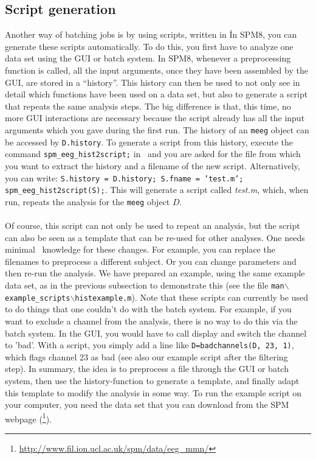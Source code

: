 \subsection{Script generation}
Another way of batching jobs is by using scripts, written in \matlab\. In SPM8, you can generate these scripts automatically. To do this, you first have to analyze one data set using the GUI or batch system. In SPM8, whenever a preprocessing function is called, all the input arguments, once they have been assembled by the GUI, are stored in a ``history''. This history can then be used to not only see in detail which functions have been used on a data set, but also to generate a script that repeats the same analysis steps. The big difference is that, this time, no more GUI interactions are necessary because the script already has all the input arguments which you gave during the first run. The history of an \texttt{meeg} object can be accessed by \texttt{D.history}. To generate a script from this history, execute the command \texttt{spm\_eeg\_hist2script;} in \matlab\, and you are asked for the file from which you want to extract the history and a filename of the new script. Alternatively, you can write: \texttt{S.history = D.history; S.fname = 'test.m'; spm\_eeg\_hist2script(S);}. This will generate a script called \textit{test.m}, which, when run, repeats the analysis for the \texttt{meeg} object $D$.
\\
\\
Of course, this script can not only be used to repeat an analysis, but the script can also be seen as a template that can be re-used for other analyses. One needs minimal \matlab\ knowledge for these changes. For example, you can replace the filenames to preprocess a different subject. Or you can change parameters and then re-run the analysis. We have prepared an example, using the same example data set, as in the previous subsection to demonstrate this (see the file \texttt{man$\backslash$example\_scripts$\backslash$histexample.m}). Note that these scripts can currently be used to do things that one couldn't do with the batch system. For example, if you want to exclude a channel from the analysis, there is no way to do this via the batch system. In the GUI, you would have to call display and switch the channel to 'bad'. With a script, you simply add a line like \texttt{D=badchannels(D, 23, 1)}, which flags channel 23 as bad (see also our example script after the filtering step). In summary, the idea is to preprocess a file through the GUI or batch system, then use the history-function to generate a template, and finally adapt this template to modify the analysis in some way. To run the example script on your computer, you need the data set that you can download from the SPM webpage (\footnote{\url{http://www.fil.ion.ucl.ac.uk/spm/data/eeg\_mmn/}}).
